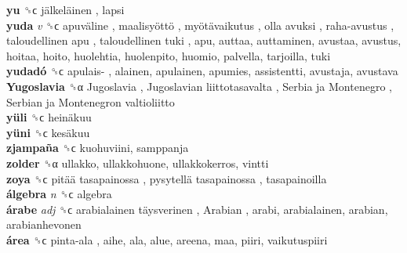 \textbf{yu} ␝ϲ   jälkeläinen , lapsi  \\
\textbf{yuda} \emph{v}  ␝ϲ   apuväline ,  maalisyöttö ,  myötävaikutus ,  olla avuksi ,  raha-avustus ,  taloudellinen apu ,  taloudellinen tuki , apu, auttaa, auttaminen, avustaa, avustus, hoitaa, hoito, huolehtia, huolenpito, huomio, palvella, tarjoilla, tuki  \\
\textbf{yudadó} ␝ϲ   apulais- , alainen, apulainen, apumies, assistentti, avustaja, avustava  \\
\textbf{Yugoslavia} ␝α   Jugoslavia ,  Jugoslavian liittotasavalta ,  Serbia ja Montenegro ,  Serbian ja Montenegron valtioliitto   \\
\textbf{yüli} ␝ϲ   heinäkuu   \\
\textbf{yüni} ␝ϲ   kesäkuu   \\
\textbf{zjampaña} ␝ϲ  kuohuviini, samppanja  \\
\textbf{zolder} ␝α  ullakko, ullakkohuone, ullakkokerros, vintti  \\
\textbf{zoya} ␝ϲ   pitää tasapainossa ,  pysytellä tasapainossa , tasapainoilla  \\
\textbf{álgebra} \emph{n}  ␝ϲ  algebra  \\
\textbf{árabe} \emph{adj}  ␝ϲ   arabialainen täysverinen ,  Arabian , arabi, arabialainen, arabian, arabianhevonen  \\
\textbf{área} ␝ϲ   pinta-ala , aihe, ala, alue, areena, maa, piiri, vaikutuspiiri  \\
